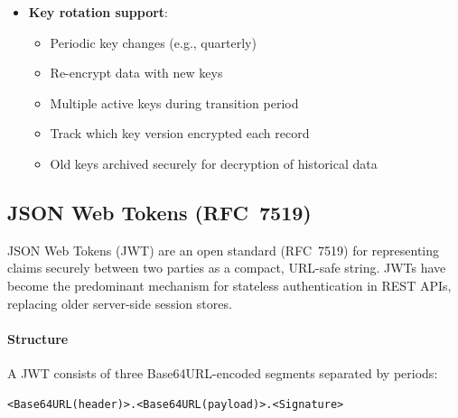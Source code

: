 \begin{itemize}
    \item \textbf{Key rotation support}:
    \begin{itemize}
        \item Periodic key changes (e.g., quarterly)
        \item Re-encrypt data with new keys
        \item Multiple active keys during transition period
        \item Track which key version encrypted each record
        \item Old keys archived securely for decryption of historical data
    \end{itemize}
\end{itemize}

\subsection{JSON Web Tokens (RFC~7519)}

JSON Web Tokens (JWT) are an open standard (RFC~7519) for representing claims securely between two parties as a compact, URL-safe string. JWTs have become the predominant mechanism for stateless authentication in REST APIs, replacing older server-side session stores.

\paragraph{Structure}

A JWT consists of three Base64URL-encoded segments separated by periods:

\begin{verbatim}
<Base64URL(header)>.<Base64URL(payload)>.<Signature>
\end{verbatim}

